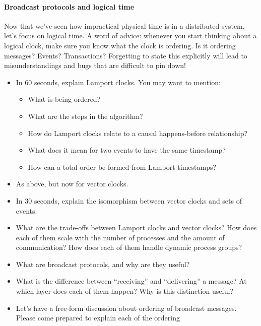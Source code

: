\documentclass[12pt,a4paper,oneside,openright]{report}
\newcommand{\question}[2]{\paragraph{#1} #2}
\begin{document}
\question{Broadcast protocols and logical time}{Now that we've seen
  how impractical physical time is in a distributed system, let's
  focus on logical time. A word of advice: whenever you start thinking
  about a logical clock, make sure you know what the clock is
  ordering. Is it ordering messages? Events? Transactions? Forgetting
  to state this explicitly will lead to misunderstandings and bugs
  that are difficult to pin down!
  \begin{itemize}
  \item In 60 seconds, explain Lamport clocks. You may want to
    mention:
    \begin{itemize}
    \item What is being ordered?
    \item What are the steps in the algorithm?
    \item How do Lamport clocks relate to a causal happens-before
      relationship?
    \item What does it mean for two events to have the same timestamp?
    \item How can a total order be formed from Lamport timestamps?
    \end{itemize}
  \item As above, but now for vector clocks.
  \item In 30 seconds, explain the isomorphism between vector clocks
    and sets of events.
  \item What are the trade-offs between Lamport clocks and vector
    clocks? How does each of them scale with the number of processes
    and the amount of communication? How does each of them handle
    dynamic process groups?
  \item What are broadcast protocols, and why are they useful?
  \item What is the difference between ``receiving'' and
    ``delivering'' a message? At which layer does each of them happen?
    Why is this distinction useful?
  \item Let's have a free-form discussion about ordering of broadcast
    messages. Please come prepared to explain each of the ordering

\end{itemize}}
\end{document}
